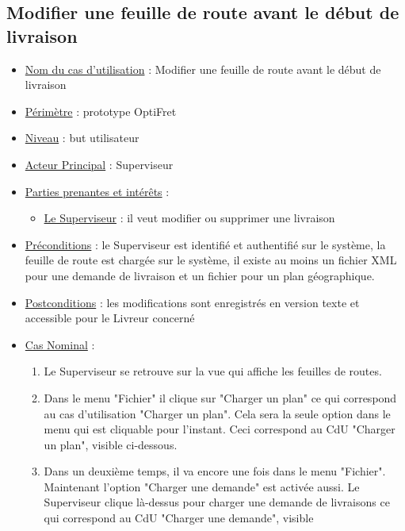 \documentclass[a4paper]{article}
\begin{document}
\subsection{Modifier une feuille de route avant le début de livraison}

\begin{itemize}[label = \textbullet, font = \color{orange}]
    \item \underline{Nom du cas d'utilisation} : Modifier une feuille de route
        avant le début de livraison
    \item \underline{Périmètre} : prototype OptiFret
    \item \underline{Niveau} : but utilisateur
    \item \underline{Acteur Principal} : Superviseur
    \item \underline{Parties prenantes et intérêts} :
    \begin{itemize}[label = \textbullet, font = \color{blue}]
        \item \underline{Le Superviseur} : il veut modifier ou supprimer une
            livraison
    \end{itemize}
    \item \underline{Préconditions} : le Superviseur est identifié et
        authentifié sur le système, la feuille de route est chargée sur le
        système, il existe au moins un fichier XML pour une demande de
        livraison et un fichier pour un plan géographique.
    \item \underline{Postconditions} : les modifications sont enregistrés en
        version texte et accessible pour le Livreur concerné
    \item \underline{Cas Nominal} :
    \begin{enumerate}
        \item Le Superviseur se retrouve sur la vue qui affiche les feuilles de
            routes.
        \item Dans le menu "Fichier" il clique sur "Charger un plan" ce qui
            correspond au cas d'utilisation "Charger un plan". Cela sera la
            seule option dans le menu qui est cliquable pour l'instant. Ceci
            correspond au CdU "Charger un plan", visible ci-dessous.
        \item Dans un deuxième temps, il va encore une fois dans le menu
            "Fichier". Maintenant l'option "Charger une demande" est activée
            aussi. Le Superviseur clique là-dessus pour charger une demande de
            livraisons ce qui correspond au CdU "Charger une demande", visible

\end{enumerate}
\end{itemize}
\end{document}
